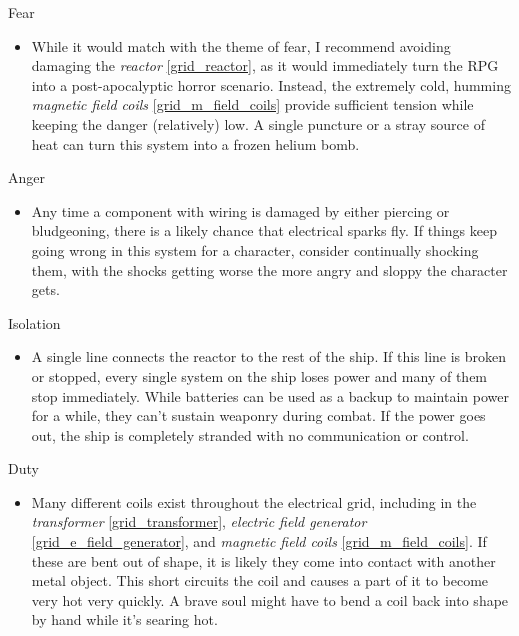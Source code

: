 \documentclass[a4paper]{article}
\begin{document}
\vspace{0.3cm}
\begin{minipage}[t]{0.4\linewidth}
Fear
\begin{itemize}
\item While it would match with the theme of fear, I recommend avoiding damaging the \textit{reactor} \ref{grid_reactor}, as it would immediately turn the RPG into a post-apocalyptic horror scenario. Instead, the extremely cold, humming \textit{magnetic field coils} \ref{grid_m_field_coils} provide sufficient tension while keeping the danger (relatively) low. A single puncture or a stray source of heat can turn this system into a frozen helium bomb. 
\end{itemize}
\end{minipage} 
\begin{minipage}[t]{0.4\linewidth}
Anger
\begin{itemize}
\item Any time a component with wiring is damaged by either piercing or bludgeoning, there is a likely chance that electrical sparks fly. If things keep going wrong in this system for a character, consider continually shocking them, with the shocks getting worse the more angry and sloppy the character gets.
\end{itemize}
\end{minipage}

\begin{minipage}[t]{0.4\linewidth}
Isolation
\begin{itemize}
\item A single line connects the reactor to the rest of the ship. If this line is broken or stopped, every single system on the ship loses power and many of them stop immediately. While batteries can be used as a backup to maintain power for a while, they can't sustain weaponry during combat. If the power goes out, the ship is completely stranded with no communication or control.
\end{itemize}
\end{minipage}
\begin{minipage}[t]{0.4\linewidth}
Duty
\begin{itemize}
\item Many different coils exist throughout the electrical grid, including in the \textit{transformer} \ref{grid_transformer}, \textit{electric field generator} \ref{grid_e_field_generator}, and \textit{magnetic field coils} \ref{grid_m_field_coils}. If these are bent out of shape, it is likely they come into contact with another metal object. This short circuits the coil and causes a part of it to become very hot very quickly. A brave soul might have to bend a coil back into shape by hand while it's searing hot.
\end{itemize}
\end{minipage}
\end{document}
